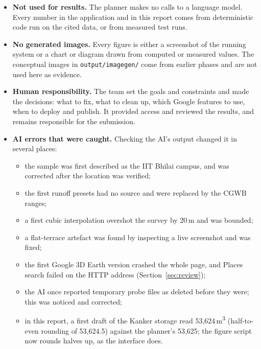 \documentclass[11pt,a4paper]{article}
\newcommand{\code}[1]{\texttt{#1}}
\newcommand{\mthree}{m\textsuperscript{3}}
\begin{document}
\begin{itemize}
\item \textbf{Not used for results.} The planner makes no calls to a language model. Every number in the application and in this report comes from deterministic code run on the cited data, or from measured test runs.
\item \textbf{No generated images.} Every figure is either a screenshot of the running system or a chart or diagram drawn from computed or measured values. The conceptual images in \code{output/imagegen/} come from earlier phases and are not used here as evidence.
\item \textbf{Human responsibility.} The team set the goals and constraints and made the decisions: what to fix, what to clean up, which Google features to use, when to deploy and publish. It provided access and reviewed the results, and remains responsible for the submission.
\item \textbf{AI errors that were caught.} Checking the AI's output changed it in several places:
  \begin{itemize}
  \item the sample was first described as the IIT Bhilai campus, and was corrected after the location was verified;
  \item the first runoff presets had no source and were replaced by the CGWB ranges;
  \item a first cubic interpolation overshot the survey by 20\,m and was bounded;
  \item a flat-terrace artefact was found by inspecting a live screenshot and was fixed;
  \item the first Google 3D Earth version crashed the whole page, and Places search failed on the HTTP address (Section~\ref{sec:review});
  \item the AI once reported temporary probe files as deleted before they were; this was noticed and corrected;
  \item in this report, a first draft of the Kanker storage read 53,624\,\mthree{} (half-to-even rounding of 53,624.5) against the planner's 53,625; the figure script now rounds halves up, as the interface does.
  \end{itemize}
\end{itemize}

\end{document}
